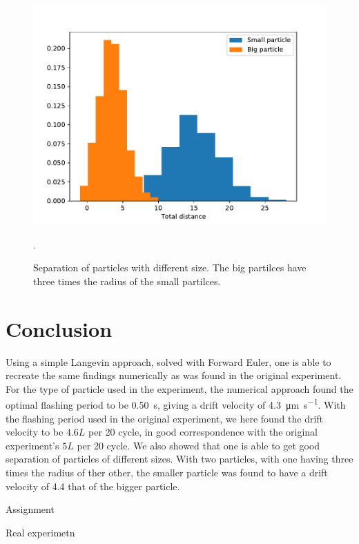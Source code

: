 \documentclass[a4paper, 12pt]{article}
\begin{document}
\begin{figure}[ht]
\centering
\includegraphics[width=.75\textwidth]{media/particle_separation}
\caption{Separation of particles with different size.
The big partilces have three times the radius of the small partilces.
\label{fig:separation}}.
\end{figure}

\section{Conclusion}
Using a simple Langevin approach, solved with Forward Euler, one is able to recreate the same findings numerically as was found in the original experiment.
For the type of particle used in the experiment, the numerical approach found the optimal flashing period to be \SI{0.50}{s}, giving a drift velocity of \SI{4.3}{\micro\meter\per\second}.
With the flashing period used in the original experiment, we here found the drift velocity to be $4.6L$ per 20 cycle, in good correspondence with the original experiment's $5L$ per 20 cycle.
We also showed that one is able to get good separation of particles of different sizes.
With two particles, with one having three times the radius of ther other, the smaller particle was found to have a drift velocity of 4.4 that of the bigger particle.

\begin{thebibliography}{9}
 Assignment

   Real experimetn
\end{thebibliography}
\end{document}
